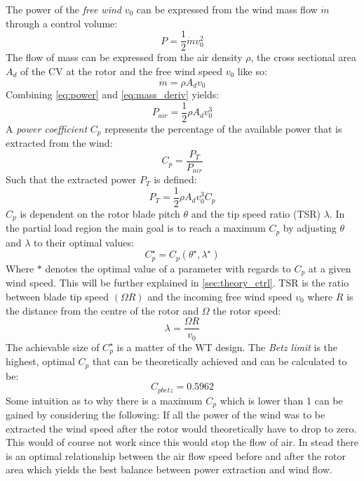 \noindent The power of the \textit{free wind} $ v_0 $ can be expressed from the wind mass flow $ \dot{m} $ through a control volume:
\begin{equation} \label{eq:power}
	P = \dfrac{1}{2} \dot{m} v_0^2
\end{equation}
The flow of mass can be expressed from the air density $ \rho $, the cross sectional area $ A_d $ of the CV at the rotor and the free wind speed $ v_0 $ like so:
\begin{equation}\label{eq:mass_deriv}
	\dot{m} = \rho A_d v_0
\end{equation}
Combining \cref{eq:power} and \cref{eq:mass_deriv} yields:
\begin{equation}\label{eq:power2}
	P_{air} = \dfrac{1}{2} \rho A_d v_0^3
\end{equation}
A \textit{power coefficient} $ C_p $ represents the percentage of the available power that is extracted from the wind:
\begin{equation}\label{eq:Cp}
	C_p = \dfrac{P_T}{P_{air}}
\end{equation}
Such that the extracted power $ P_T $ is defined:
\begin{equation}\label{eq:power_w_Cp}
	P_{T} = \dfrac{1}{2} \rho A_d v_0^3 C_p
\end{equation}
$ C_p $ is dependent on the rotor blade pitch $ \theta $ and the tip speed ratio (TSR) $ \lambda $. In the partial load region the main goal is to reach a maximum $ C_p $ by adjusting $ \theta $ and  $ \lambda $ to their optimal values:
\begin{equation}\label{eq:cp_optimal}
	C_p^\star = C_p(\theta^\star, \lambda^\star)
\end{equation}
Where $ * $ denotes the optimal value of a parameter with regards to $ C_p $ at a given wind speed. This will be further explained in \cref{sec:theory_ctrl}. TSR is the ratio between blade tip speed $ (\Omega R) $ and the incoming free wind speed $v_0$ where $ R $ is the distance from the centre of the rotor and $ \Omega $ the rotor speed:
\begin{equation}\label{eq:tipspeedratio}
	\lambda = \dfrac{\Omega R}{v_0}
\end{equation}
The achievable size of $ C_p^\star $ is a matter of the WT design. The \textit{Betz limit} is the highest, optimal $ C_p $ that can be theoretically achieved and can be calculated to be:
\begin{equation}\label{eq:betzlimit}
	C_{pbetz} = 0.5962
\end{equation}
Some intuition as to why there is a maximum $ C_p $ which is lower than 1 can be gained by considering the following: If all the power of the wind was to be extracted the wind speed after the rotor would theoretically have to drop to zero. This would of course not work since this would stop the flow of air. In stead there is an optimal relationship between the air flow speed before and after the rotor area which yields the best balance between power extraction and wind flow.

